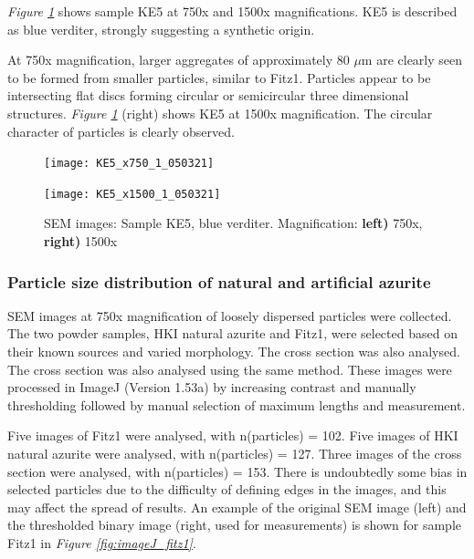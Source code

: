 \textit{Figure \ref{fig:KE5_sem_1}} shows sample KE5 at 750x and 1500x magnifications. KE5 is described as blue verditer, strongly suggesting a synthetic origin.

At 750x magnification, larger aggregates of approximately 80 $\mu$m are clearly seen to be formed from smaller particles, similar to Fitz1. Particles appear to be intersecting flat discs forming circular or semicircular three dimensional structures. \textit{Figure \ref{fig:KE5_sem_1}} (right) shows KE5 at 1500x magnification. The circular character of particles is clearly observed.


\begin{figure}[H]
\centering
\begin{minipage}{.45\textwidth}
  \centering
  \texttt{[image: KE5\_x750\_1\_050321]}
\end{minipage}
\begin{minipage}{.45\textwidth}
  \centering
  \texttt{[image: KE5\_x1500\_1\_050321]}
\end{minipage}
\caption[SEM images: Sample KE5, blue verditer]{SEM images: Sample KE5, blue verditer. Magnification: \textbf{left)} 750x, \textbf{right)} 1500x}
\label{fig:KE5_sem_1}
\end{figure}

\subsubsection[Particle size distribution of natural and artificial azurite]{Particle size distribution of natural and artificial azurite}
\label{subsubsection3.1.1.1}

SEM images at 750x magnification of loosely dispersed particles were collected. The two powder samples, HKI natural azurite and Fitz1, were selected based on their known sources and varied morphology. The cross section was also analysed. The cross section was also analysed using the same method. These images were processed in ImageJ (Version 1.53a) by increasing contrast and manually thresholding followed by manual selection of maximum lengths and measurement.

Five images of Fitz1 were analysed, with n(particles) = 102. Five images of HKI natural azurite were analysed, with n(particles) = 127. Three images of the cross section were analysed, with n(particles) = 153. There is undoubtedly some bias in selected particles due to the difficulty of defining edges in the images, and this may affect the spread of results. An example of the original SEM image (left) and the thresholded binary image (right, used for measurements) is shown for sample Fitz1 in \textit{Figure \ref{fig:imageJ_fitz1}}.


